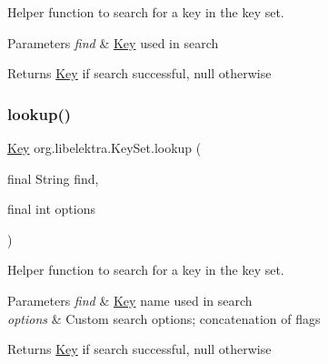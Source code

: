 Helper function to search for a key in the key set. 


\begin{DoxyParams}{Parameters}
{\em find} & \hyperlink{classorg_1_1libelektra_1_1Key}{Key} used in search \\
\hline
\end{DoxyParams}
\begin{DoxyReturn}{Returns}
\hyperlink{classorg_1_1libelektra_1_1Key}{Key} if search successful, null otherwise 
\end{DoxyReturn}
\mbox{\label{classorg_1_1libelektra_1_1KeySet_aa17a04907eb8c8d2a9a488788d0039ea}} 
\subsubsection{\texorpdfstring{lookup()}{lookup()}\hspace{0.1cm}{\footnotesize\ttfamily [3/4]}}
{\footnotesize\ttfamily \hyperlink{classorg_1_1libelektra_1_1Key}{Key} org.\+libelektra.\+Key\+Set.\+lookup (\begin{DoxyParamCaption}\item[{final String}]{find,  }\item[{final int}]{options }\end{DoxyParamCaption})\hspace{0.3cm}{\ttfamily [inline]}}



Helper function to search for a key in the key set. 


\begin{DoxyParams}{Parameters}
{\em find} & \hyperlink{classorg_1_1libelektra_1_1Key}{Key} name used in search \\
\hline
{\em options} & Custom search options; concatenation of flags \\
\hline
\end{DoxyParams}
\begin{DoxyReturn}{Returns}
\hyperlink{classorg_1_1libelektra_1_1Key}{Key} if search successful, null otherwise 
\end{DoxyReturn}
\mbox{\label{classorg_1_1libelektra_1_1KeySet_a69921726091c9a775bb8ece1f1e3a858}} 
